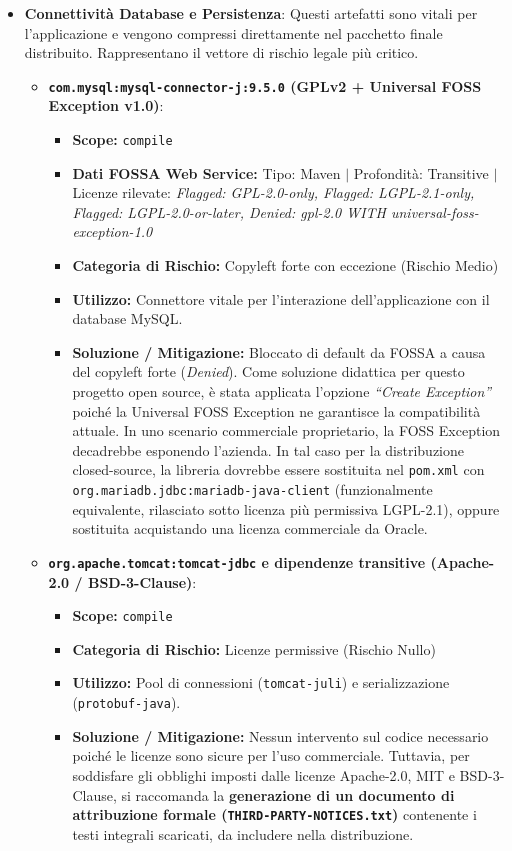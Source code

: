 \begin{itemize}
    \item \textbf{Connettività Database e Persistenza}:
    Questi artefatti sono vitali per l'applicazione e vengono compressi direttamente nel pacchetto finale distribuito. Rappresentano il vettore di rischio legale più critico.
    \begin{itemize}
        \item \textbf{\texttt{com.mysql:mysql-connector-j:9.5.0} (GPLv2 + Universal FOSS Exception v1.0)}:
        \begin{itemize}
            \item \textbf{Scope:} \texttt{compile}
            \item \textbf{Dati FOSSA Web Service:} Tipo: Maven $\vert$ Profondità: Transitive $\vert$ Licenze rilevate: \textit{Flagged: GPL-2.0-only, Flagged: LGPL-2.1-only, Flagged: LGPL-2.0-or-later, Denied: gpl-2.0 WITH universal-foss-exception-1.0}
            \item \textbf{Categoria di Rischio:} Copyleft forte con eccezione (Rischio Medio)
            \item \textbf{Utilizzo:} Connettore vitale per l'interazione dell'applicazione con il database MySQL.
            \item \textbf{Soluzione / Mitigazione:} Bloccato di default da FOSSA a causa del copyleft forte (\textit{Denied}). Come soluzione didattica per questo progetto open source, è stata applicata l'opzione \textit{``Create Exception''} poiché la Universal FOSS Exception ne garantisce la compatibilità attuale. In uno scenario commerciale proprietario, la FOSS Exception decadrebbe esponendo l'azienda. In tal caso per la distribuzione closed-source, la libreria dovrebbe essere sostituita nel \texttt{pom.xml} con \texttt{org.mariadb.jdbc:mariadb-java-client} (funzionalmente equivalente, rilasciato sotto licenza più permissiva LGPL-2.1), oppure sostituita acquistando una licenza commerciale da Oracle.
        \end{itemize}
        
        \item \textbf{\texttt{org.apache.tomcat:tomcat-jdbc} e dipendenze transitive (Apache-2.0 / BSD-3-Clause)}:
        \begin{itemize}
            \item \textbf{Scope:} \texttt{compile}
            \item \textbf{Categoria di Rischio:} Licenze permissive (Rischio Nullo)
            \item \textbf{Utilizzo:} Pool di connessioni (\texttt{tomcat-juli}) e serializzazione (\texttt{protobuf-java}).
            \item \textbf{Soluzione / Mitigazione:} Nessun intervento sul codice necessario poiché le licenze sono sicure per l'uso commerciale. Tuttavia, per soddisfare gli obblighi imposti dalle licenze Apache-2.0, MIT e BSD-3-Clause, si raccomanda la \textbf{generazione di un documento di attribuzione formale (\texttt{THIRD-PARTY-NOTICES.txt})} contenente i testi integrali scaricati, da includere nella distribuzione.
        \end{itemize}
    \end{itemize}


\end{itemize}

